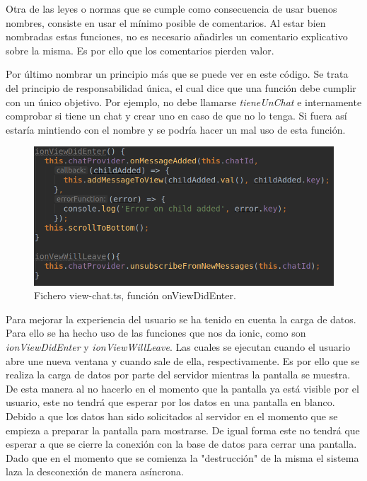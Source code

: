Otra de las leyes o normas que se cumple como consecuencia de usar
buenos nombres, consiste en usar el mínimo posible de comentarios. Al estar bien nombradas
estas funciones, no es necesario añadirles un comentario explicativo sobre la misma.
Es por ello que los comentarios pierden valor.

Por último nombrar un principio más que se puede ver en este
código. Se trata del principio de responsabilidad única, el cual dice
que una función debe cumplir con un único objetivo. Por ejemplo, no debe llamarse
\textit{tieneUnChat} e internamente comprobar si tiene un chat y crear uno en caso de que no lo tenga.
Si fuera así estaría mintiendo con el nombre y se podría hacer un mal uso de esta función.

\begin{figure}
    \includegraphics[width=\linewidth]{./images/code/view-chat-ts-onViewDidEnter.png}
    \caption{Fichero view-chat.ts, función onViewDidEnter.}
    \label{view-chat.ts}
\end{figure}

\medskip
Para mejorar la experiencia del usuario se ha tenido en cuenta la carga
de datos. Para ello se ha hecho uso de las funciones que nos da ionic,
como son \textit{ionViewDidEnter} y \textit{ionViewWillLeave}. Las cuales se
ejecutan cuando el usuario abre une nueva ventana y cuando sale de ella, respectivamente.
Es por ello que se realiza la carga de datos por parte del servidor mientras la pantalla se muestra.
De esta manera al no hacerlo en el momento que la pantalla ya está visible por el usuario,
este no tendrá que esperar por los datos en una pantalla en blanco.
Debido a que los datos han sido solicitados al servidor
en el momento que se empieza a preparar la pantalla para mostrarse. De igual
forma este no tendrá que esperar a que se cierre la conexión con la base de
datos para cerrar una pantalla. Dado que en el momento que se comienza la "destrucción"
de la misma el sistema laza la desconexión de manera asíncrona.